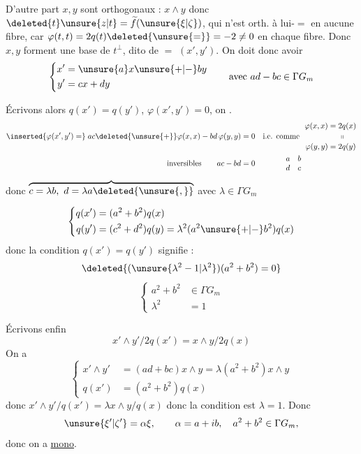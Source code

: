 D'autre part $x,y$ sont orthogonaux : $x\wedge y$ donc  $\deleted{t}\unsure{z|t}=\widetilde f(\unsure{\xi|\zeta})$, qui n'est  orth. à lui-$=$ en aucune fibre, car $\varphi(t,t)=2q(t)\deleted{\unsure{=}}=-2\ne0$ en chaque fibre. Donc $x,y$ forment une base de $t^\perp$, dito de $=$ $(x',y')$. On doit donc avoir
\[
\left\{\begin{aligned}x'&=\unsure{a}x\unsure{+|-}by\\y'&=cx+dy\end{aligned}\right.\qquad\text{avec }ad-bc\in\Gamma G_m
\]

 Écrivons alors $q(x')=q(y')$, $\varphi(x',y')=0$, on . 
\[
\begin{aligned}\inserted{\varphi(x',y')=}\;ac\deleted{\unsure{+}}\varphi(x,x)-bd\,\varphi(y,y)&=0\quad\text{i.e. comme }\ \begin{aligned}\varphi(x,x)&=2q(x)\\[-.4ex] &\hspace{1.4em}\shortparallel\\[-.4ex]\varphi(y,y)&=2q(y)\end{aligned}\\[-.1ex]\text{inversibles}\qquad ac-bd&=0 \qquad\qquad \begin{matrix}a&b\\d&c\end{matrix}\end{aligned}
\]
donc $\overbrace{c=\lambda b,\ d=\lambda a\deleted{\unsure{,}}}$ avec $\lambda\in\Gamma G_m$

 
\[
\left\{\begin{aligned}q(x')&=(a^2+b^2)q(x)\\q(y')&=(c^2+d^2)q(y)=\lambda^2(a^2\unsure{+|-}b^2)q(x)\end{aligned}\right.
\]
donc la condition $q(x')=q(y')$  signifie :
\[
\deleted{(\unsure{\lambda^2-1|\lambda^2})(a^2+b^2)=0}
\]
\[
\left\{\begin{aligned}a^2+b^2&\in\Gamma G_m\\\lambda^2&=1\end{aligned}\right.
\]

\qquad {}

Écrivons enfin
\[
x'\wedge y'/2q(x')=x\wedge y/2q(x)
\]
On a
\[
\left\{\begin{aligned}x'\wedge y'&=(ad+bc)x\wedge y=\lambda(a^2+b^2)x\wedge y\\q(x')&=(a^2+b^2)q(x)\end{aligned}\right.
\]
donc $x'\wedge y'/q(x')=\lambda x\wedge y/q(x)$ donc la condition est $\lambda=1$. Donc
\[
\unsure{\xi'|\zeta'}=\alpha\xi,\qquad\alpha=a+ib,\quad a^2+b^2\in\Gamma G_m,
\]
donc on a \uline{mono}.

